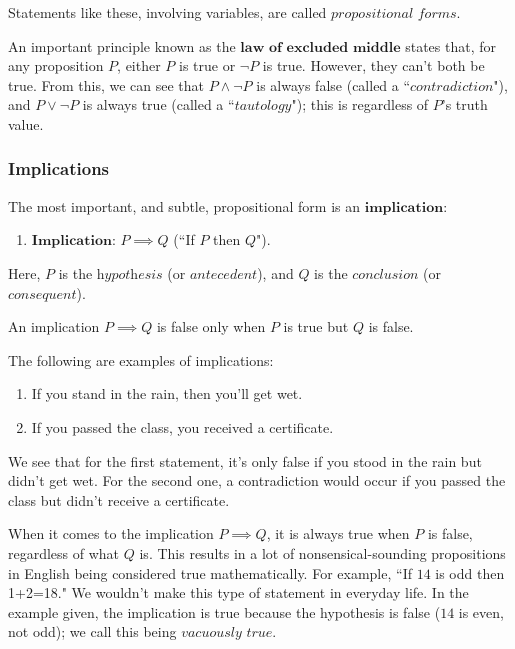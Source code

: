 \documentclass[openany]{book}
\begin{document}
Statements like these, involving variables, are called $\textit{propositional forms}$.

An important principle known as the $\textbf{law of excluded middle}$ states that, for any proposition $P$, either $P$ is true or $\neg P$ is true. However, they can't both be true. From this, we can see that $P\land\neg P$ is always false (called a ``$\textit{contradiction}$"), and $P\lor\neg P$ is always true (called a ``$\textit{tautology}$"); this is regardless of $P$'s truth value.

\subsubsection{Implications}

\begin{defn}[Implication]
	The most important, and subtle, propositional form is an $\textbf{implication}$:
	\begin{enumerate}[label={}]
		\item $\textbf{Implication}$: $P\implies Q$ (``If $P$ then $Q$").
	\end{enumerate}
\end{defn}

Here, $P$ is the $\textit{hypothesis}$ (or $\textit{antecedent}$), and $Q$ is the $\textit{conclusion}$ (or $\textit{consequent}$).

An implication $P\implies Q$ is false only when $P$ is true but $Q$ is false. 

\begin{example}
	The following are examples of implications:
	\begin{enumerate}
		\item If you stand in the rain, then you'll get wet. 
		\item If you passed the class, you received a certificate.
	\end{enumerate}
\end{example}

We see that for the first statement, it's only false if you stood in the rain but didn't get wet. For the second one, a contradiction would occur if you passed the class but didn't receive a certificate.

When it comes to the implication $P\implies Q$, it is always true when $P$ is false, regardless of what $Q$ is. This results in a lot of nonsensical-sounding propositions in English being considered true mathematically. For example, ``If $14$ is odd then 1+2=18." We wouldn't make this type of statement in everyday life. In the example given, the implication is true because the hypothesis is false ($14$ is even, not odd); we call this being $\textit{vacuously true}$.
\end{document}
